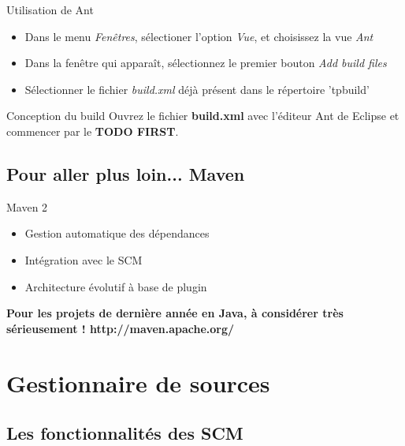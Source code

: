 \documentclass[handout]{beamer}
\begin{document}
\begin{frame}
	\begin{block}{Utilisation de Ant}
		\begin{itemize}
			\item Dans le menu \textit{Fenêtres}, sélectioner l'option \textit{Vue}, et choisissez la vue \textit{Ant}
			\item Dans la fenêtre qui apparaît, sélectionnez le premier bouton \textit{Add build files}
			\item Sélectionner le fichier \textit{build.xml} déjà présent dans le répertoire 'tpbuild'
		\end{itemize}
	\end{block}

	\begin{block}{Conception du build}
	 	Ouvrez le fichier \textbf{build.xml} avec l'éditeur Ant de Eclipse et commencer par le \textbf{TODO FIRST}.
	\end{block} 
\end{frame}

\subsection{Pour aller plus loin... Maven}

\begin{frame}
	\begin{block}{Maven 2}
		\begin{itemize}
			\item Gestion automatique des dépendances
			\item Intégration avec le SCM
			\item Architecture évolutif à base de plugin
		\end{itemize}
		\begin{center}
			\textbf{Pour les projets de dernière année en Java, à considérer très sérieusement ! http://maven.apache.org/}
		\end{center}
	\end{block}
\end{frame}


\section{Gestionnaire de sources}
\subsection{Les fonctionnalités des SCM}
\end{document}

